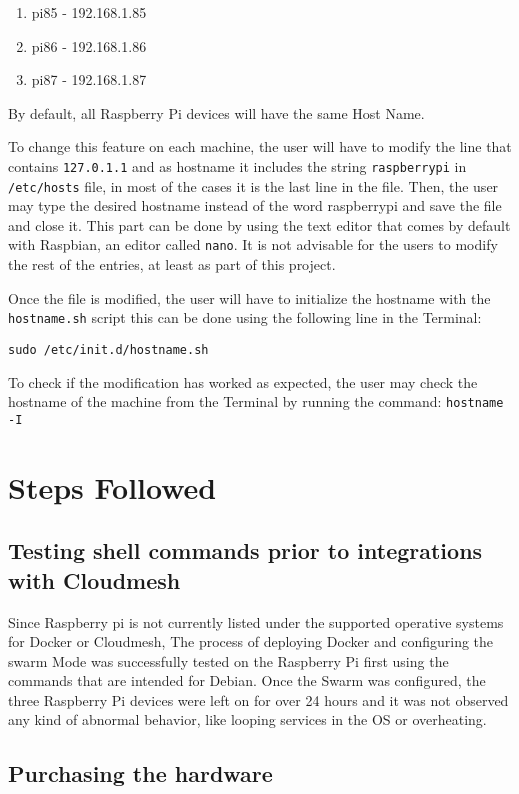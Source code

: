\begin{enumerate}
	\item pi85 -  192.168.1.85
	\item pi86 -  192.168.1.86
	\item pi87 -  192.168.1.87
\end{enumerate}

By default, all Raspberry Pi devices will have the same Host Name.
	
To change this feature on each machine, the user will have to modify
the line that contains \verb|127.0.1.1| and as hostname
it includes the string \verb|raspberrypi| in
\verb|/etc/hosts| file, in most of the cases it is the
last line in the file. Then, the user may type the desired hostname
instead of the word raspberrypi and save the file and close it. This
part can be done by using the text editor that comes by default with
Raspbian, an editor called \verb|nano|.  It is not
advisable for the users to modify the rest of the entries, at least as
part of this project.
	
Once the file is modified, the user will have to initialize the
hostname with the \verb|hostname.sh| script this can be done using the
following line in the Terminal:
  
\verb|sudo /etc/init.d/hostname.sh|
	
To check if the modification has worked as expected, the user may
check the hostname of the machine from the Terminal by running the
command: \verb|hostname -I|
	

\section{Steps Followed}
		
\subsection{Testing shell commands prior to integrations with Cloudmesh}
	
Since Raspberry pi is not currently listed under the supported
operative systems for Docker or Cloudmesh, The process of deploying
Docker and configuring the swarm Mode was successfully tested on the
Raspberry Pi first using the commands that are intended for Debian.
Once the Swarm was configured, the three Raspberry Pi devices were
left on for over 24 hours and it was not observed any kind of abnormal
behavior, like looping services in the OS or overheating.
		
\subsection{Purchasing the hardware}
	
